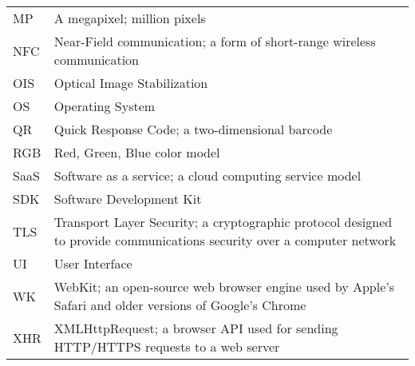 \documentclass[thesis.tex]{subfiles}
\begin{document}
\begin{longtable}{@{}p{}p{}@{}}
MP & A megapixel; million pixels \\
NFC & Near-Field communication; a form of short-range wireless communication \\
OIS & Optical Image Stabilization \\
OS & Operating System \\
QR & Quick Response Code; a two-dimensional barcode \\
RGB & Red, Green, Blue color model \\
SaaS & Software as a service; a cloud computing service model \\
SDK & Software Development Kit \\
TLS & Transport Layer Security; a cryptographic protocol designed to provide communications security over a computer network \\
UI & User Interface \\
WK & WebKit; an open-source web browser engine used by Apple's Safari and older versions of Google's Chrome \\
XHR & XMLHttpRequest; a browser API used for sending HTTP/HTTPS requests to a web server \\

\end{longtable}
\end{document}
